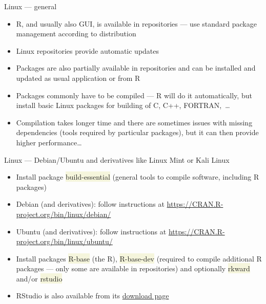\documentclass[compress, ucs, xelatex, 11pt, xcolor=svgnames, aspectratio=169,
	hyperref={
		bookmarks=true,
		unicode=true,
		colorlinks=true,
		pdftitle={Molecular data in R},
		plainpages=false,
		pdfauthor={Vojtech Zeisek},
		pdfsubject={Course about phylogeny and evolution in R},
		pdfcreator={XeLaTeX},
		pdfkeywords={R, evolution, phylogeny, molecular data},
		linkcolor=Crimson, %
		anchorcolor=Magenta, %
		citecolor=Magenta, %
		filecolor=Magenta, %
		menucolor=Magenta, %
		urlcolor=DodgerBlue, %
		pdftex},
	url={hyphens, lowtilde} %
	]{beamer}
\renewcommand{\texttt}[1]{\colorbox{Beige}{{\ttfamily #1}}}
\begin{document}
\begin{frame}{Linux --- general}
	\begin{itemize}
		\item R, and usually also GUI, is available in repositories --- use standard package management according to distribution
		\item Linux repositories provide automatic updates
		\item Packages are also partially available in repositories and can be installed and updated as usual application or from R
		\item Packages commonly have to be compiled --- R will do it automatically, but install basic Linux packages for building of C, C++, FORTRAN,~\ldots
		\item Compilation takes longer time and there are sometimes issues with missing dependencies (tools required by particular packages), but it can then provide higher performance\ldots
	\end{itemize}
\end{frame}

\begin{frame}{Linux --- Debian/Ubuntu and derivatives like Linux Mint or Kali Linux}
	\begin{itemize}
		\item Install package \texttt{build-essential} (general tools to compile software, including R packages)
		\item Debian (and derivatives): follow instructions at \url{https://CRAN.R-project.org/bin/linux/debian/}
		\item Ubuntu (and derivatives): follow instructions at \url{https://CRAN.R-project.org/bin/linux/ubuntu/}
		\item Install packages \texttt{R-base} (the R), \texttt{R-base-dev} (required to compile additional R packages --- only some are available in repositories) and optionally \texttt{rkward} and/or \texttt{rstudio}
		\item RStudio is also available from its \href{https://rstudio.com/products/rstudio/download/\#download}{download page}
	\end{itemize}
\end{frame}
\end{document}
